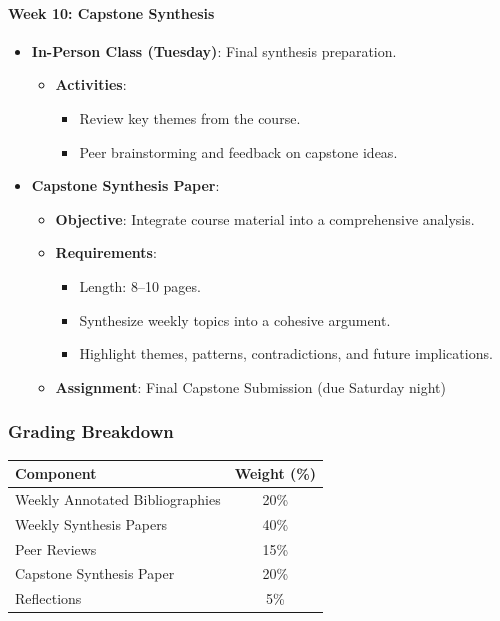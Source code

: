 \documentclass[12pt, letterpaper]{article}
\begin{document}
\paragraph{Week 10: Capstone Synthesis}
\begin{itemize}
    \item \textbf{In-Person Class (Tuesday)}: Final synthesis preparation.
    \begin{itemize}
        \item \textbf{Activities}:
        \begin{itemize}
            \item Review key themes from the course.
            \item Peer brainstorming and feedback on capstone ideas.
        \end{itemize}
    \end{itemize}
    \item \textbf{Capstone Synthesis Paper}:
    \begin{itemize}
        \item \textbf{Objective}: Integrate course material into a comprehensive analysis.
        \item \textbf{Requirements}:
        \begin{itemize}
            \item Length: 8--10 pages.
            \item Synthesize weekly topics into a cohesive argument.
            \item Highlight themes, patterns, contradictions, and future implications.
        \end{itemize}
        \item \textbf{Assignment}: Final Capstone Submission (due Saturday night)
    \end{itemize}
\end{itemize}

\subsubsection*{Grading Breakdown}
\begin{table}[h!]
\centering
\begin{tabular}{|l|c|}
\hline
\textbf{Component} & \textbf{Weight (\%)} \\
\hline
Weekly Annotated Bibliographies & 20\% \\
Weekly Synthesis Papers & 40\% \\
Peer Reviews & 15\% \\
Capstone Synthesis Paper & 20\% \\
Reflections & 5\% \\
\hline
\end{tabular}
\end{table}
\end{document}
